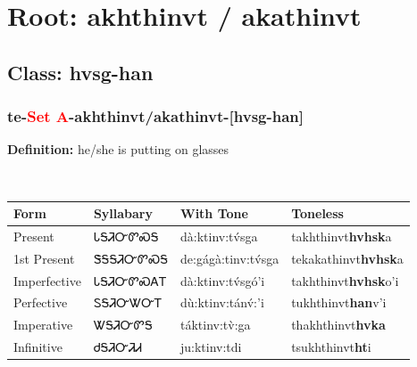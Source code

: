 \needspace{4in}
\section*{Root: akhthinvt / akathinvt}
\nopagebreak
{}
\needspace{3in}
\subsection*{Class: hvsg-han}
\nopagebreak
\needspace{2in}
\subsubsection*{te{-}\textcolor{Red}{Set A}{-}\textbf{akhthinvt/akathinvt}{-}[hvsg-han]}
\nopagebreak
\textbf{Definition: } he/she is putting on glasses
\\[0.5em]
\begin{tabularx}{\textwidth}{l X X X}%
\toprule%
\textbf{Form}&\textbf{Syllabary}&\textbf{With Tone}&\textbf{Toneless}\\%
\midrule%
Present&ᏓᎦᏘᏅᏛᏍᎦ&dà:ktinv:tv́sga&takhthinvt\textbf{hvhsk}a\\%
1st Present&ᏕᎦᎦᏘᏅᏛᏍᎦ&de:gágà:tinv:tv́sga&tekakathinvt\textbf{hvhsk}a\\%
Imperfective&ᏓᎦᏘᏅᏛᏍᎪᎢ&dà:ktinv:tv́sgó’i&takhthinvt\textbf{hvhsk}o'i\\%
Perfective&ᏚᎦᏘᏅᏔᏅᎢ&dù:ktinv:tánv́:’i&tukhthinvt\textbf{han}v'i\\%
Imperative&ᏔᎦᏘᏅᏛᎦ&táktinv:tv̀:ga&thakhthinvt\textbf{hvka}\\%
Infinitive&ᏧᎦᏘᏅᏘᏗ&ju:ktinv:tdi&tsukhthinvt\textbf{ht}i\\%
\bottomrule%
\end{tabularx}
\\[1em]
\needspace{2in}

